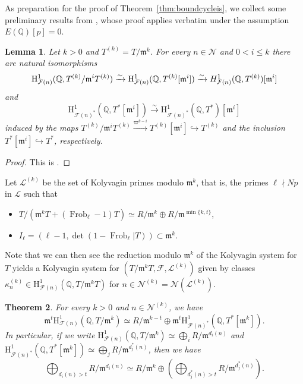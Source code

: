 \documentclass[10pt,reqno]{amsart}
\numberwithin{equation}{section}
\theoremstyle{plain}
\newtheorem{thm}{Theorem}[subsection] %
\theoremstyle{definition}
\theoremstyle{definition}
\theoremstyle{plain}
\theoremstyle{plain}
\newtheorem{lemma}[thm]{Lemma}
\theoremstyle{plain}
\theoremstyle{plain}
\theoremstyle{plain}
\theoremstyle{plain}
\newcommand{\Z}{\mathbb{Z}}
\newcommand{\Q}{\mathbb{Q}}
\DeclareMathOperator{\frob}{Frob}
\newcommand{\Fcal}{\mathcal{F}}
\newcommand{\cL}{\mathcal{L}}
\newcommand{\cN}{\mathcal{N}}
\newcommand{\rank}{\mathrm{rank}}
\newcommand{\fm}{\mathfrak{m}}
\newcommand{\rH}{\mathrm{H}}
\begin{document}
As preparation for the proof of Theorem~\ref{thm:boundcycleis}, we collect some preliminary results from \cite[$\S{4.1}$]{mazrub}, whose proof applies verbatim under the assumption $E(\Q)[p]=0$. %

\begin{lemma}%
\label{lemma:structure}
Let $k>0$ and $T^{(k)}=T/\fm^k$. For every $n\in\cN$ and $0< i\leq k$ there are natural isomorphisms
\[
\rH^1_{\Fcal(n)}(\Q,T^{(k)}/\fm^iT^{(k)})\xrightarrow{\sim}\rH^1_{\Fcal(n)}(\Q,T^{(k)}[\fm^i])\xrightarrow{\sim}{\rm H}_{\Fcal(n)}^1(\Q,T^{(k)})[\fm^i]\]
and
\[
\rH^1_{\Fcal(n)^*}(\Q, T^*[\fm^i])\xrightarrow{\sim}\rH^1_{\Fcal(n)^*}(\Q, T^*)[\fm^i]
\]
induced by the maps $T^{(k)}/\fm^iT^{(k)}\xrightarrow{\varpi^{k-i}}T^{(k)}[\fm^i]\hookrightarrow T^{(k)}$ and the inclusion $T^*[\fm^i]\hookrightarrow T^*$, respectively.
\end{lemma}

\begin{proof}
This is \cite[Lem.~4.1.1]{mazrub}.
\end{proof}
Let $\mathcal{L}^{(k)}$ be the set of Kolyvagin primes modulo $\fm^k$, that is,  the primes $\ell\nmid Np$ in $\cL$ such that 
\begin{itemize}
\item[(i)] $T/(\fm^kT+ (\frob_\ell -1)T)\simeq R/\fm^k\oplus R/\fm^{\min\{k,t\}}$,
\item[(ii)] $I_\ell =(\ell -1, \det (1-\frob_{\ell}|T)) \subset \fm^k$.
\end{itemize} 
Note that we can then see the reduction modulo $\fm^k$ of the Kolyvagin system for $T$ yields a Kolyvagin system for $(T/\fm^kT, \Fcal,\mathcal{L}^{(k)})$ given by classes 
$\kappa_n^{(k)}\in \rH^1_{\Fcal(n)}(\Q, T/\fm^kT)$ for $n\in \cN^{(k)} = \cN(\cL^{(k)})$.  

\begin{thm}\label{thm:strMR} 
For every $k>0$ and $n\in \mathcal{N}^{(k)}$, we have
\[
\fm^t\rH^1_{\Fcal(n)}(\Q, T/\fm^k)\simeq R/\fm^{k-t} \oplus \fm^t\rH^1_{\Fcal(n)^*}(\Q, T^*[\fm^k]).
\]
In particular, if we write $\rH^1_{\Fcal(n)}(\Q, T/\fm^k)\simeq \bigoplus_i  R/\fm^{d_i(n)}$ and $\rH^1_{\Fcal(n)^*}(\Q, T^*[\fm^k]) \simeq \bigoplus_j  R/\fm^{d^*_j(n)}$, then we have
\[
\bigoplus_{d_i(n)>t}  R/\fm^{d_i(n)} \simeq R/\fm^{k} \oplus \left( \bigoplus_{d^*_j(n)>t}  R/\fm^{d^*_j(n)}\right).
\]
\end{thm}
\end{document}
